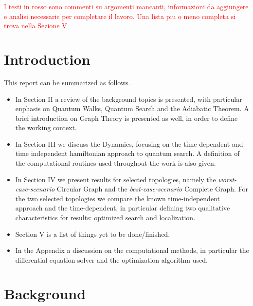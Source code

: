 \documentclass[aps,pra,reprint, onecolumn]{revtex4-2}
\newcommand{\red}[1]{\textcolor{red}{#1}}
\begin{document}

\red{I testi in rosso sono commenti su argomenti mancanti, informazioni da aggiungere e analisi necessarie per completare il lavoro. Una lista piu o meno completa si trova nella Sezione V} \\

\section{Introduction}
This report can be summarized as follows.
\begin{itemize}
\item In Section II a review of the background topics is presented, with particular enphasis on Quantum Walks, Quantum Search and the Adiabatic Theorem. A brief introduction on Graph Theory is presented as well, in order to define the working context.
\item In Section III we discuss the Dynamics, focusing on the time dependent and time independent hamiltonian approach to quantum search. A definition of the computational routines used throughout the work is also given.
\item In Section IV we present results for selected topologies, namely the \textit{worst-case-scenario} Circular Graph and the \textit{best-case-scenario} Complete Graph. For the two selected topologies we compare the known time-independent approach and the time-dependent, in particular defining two qualitative characteristics for results: optimized search and localization.
\item Section V is a list of things yet to be done/finished.
\item In the Appendix a discussion on the computational methods, in particular the differential equation solver and the optimization algorithm used. 
\end{itemize}

\section{Background}
\end{document}
